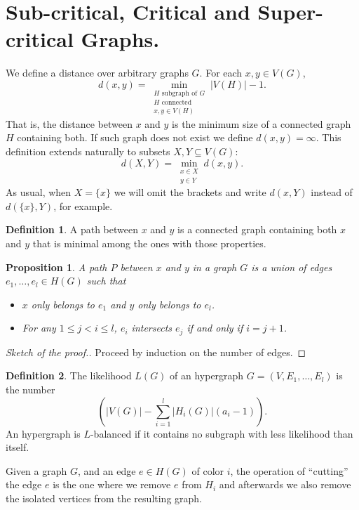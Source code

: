 \documentclass[11pt,notitlepage,a4paper]{article}
\newtheorem{proposition}{Proposition}[section]
\theoremstyle{definition}
\newtheorem{definition}{Definition}[section]
\begin{document}
\section{Sub-critical, Critical and Super-critical Graphs.}

We define a distance over arbitrary graphs $G$. For each $x, y\in V(G)$,
\[ d(x,y)= \min_{\substack{H \text{ subgraph of } G\\ 
H \text{ connected }\\
x,y\in V(H)}} |V(H)| - 1 .\]
That is, the distance between $x$ and $y$ is the minimum size
of a connected graph $H$ containing both. 
If such graph does not exist we define $d(x,y)=\infty$.
This definition extends naturally to subsets $X,Y\subseteq V(G)$:
\[ d(X,Y)=\min_{\substack{x\in X\\ y\in Y}} d(x,y).\]
As usual, when $X=\{x\}$ we will omit the brackets and write
$d(x,Y)$ instead of $d(\{x\},Y)$, for example.  \par

\begin{definition} 
	A path between $x$ and $y$ is a connected graph containing both 
	$x$ and $y$	that is minimal among the ones with those properties. 
\end{definition}

\begin{proposition}\label{prop:pathform}
	A path $P$ between $x$ and $y$ in a graph $G$ is a union of 
	edges $e_1,\dots, e_l\in H(G)$ such that
	\begin{itemize}
		\item $x$ only belongs to
		$e_1$ and $y$ only belongs to $e_l$.
		\item For any $1\leq j < i\leq l$, $e_i$ intersects
		$e_j$ if and only if $i=j+1$.
	\end{itemize}  	
\end{proposition}
\begin{proof}[Sketch of the proof.]
	Proceed by induction on the number of edges.
\end{proof}

\begin{definition}
	The likelihood $L(G)$ of an hypergraph $G=(V,E_1,\dots,E_l)$ is
	the number
	\[ \left( |V(G)| - \sum_{i=1}^l |H_i(G)|(a_i-1)\right).\]
	An hypergraph is $L$-balanced if it contains no subgraph with
	less likelihood than itself. 
\end{definition}

Given a graph $G$, and an edge $e\in H(G)$ of color $i$,
the operation of ``cutting'' the edge $e$ is the one where we remove 
$e$ from $H_i$ and afterwards we also remove the isolated 
vertices from the resulting graph.
\end{document}
